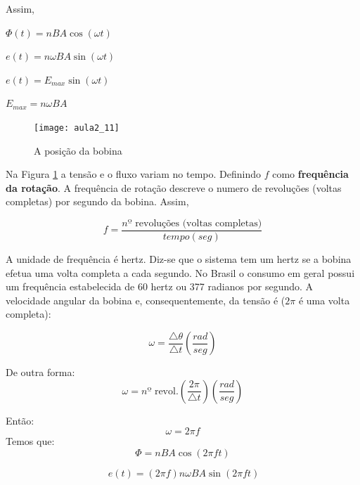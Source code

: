 Assim,

$\Phi(t)=nBA\cos(\omega t)$

$e(t)=n\omega BA\sin(\omega t)$

$e(t)=E_{max}\sin(\omega t)$

$E_{max}=n\omega BA$

\begin{figure}[H]
\begin{centering}
\texttt{[image: aula2\_11]}\protect\caption{\label{fig:aula2_11}A posição da bobina }
\end{centering}

\end{figure}

Na Figura \ref{fig:aula2_11} a tensão e o fluxo variam no tempo.
Definindo $f$ como \textbf{frequência da rotação}. A frequência de rotação
descreve o numero de revoluções (voltas completas) por segundo da
bobina. Assim,

\begin{equation}\label{eq:freq}
f=\frac{n\text{º revoluções (voltas completas)}}{tempo(seg)}
\end{equation}

A unidade de frequência é hertz. Diz-se que o sistema tem um hertz
se a bobina efetua uma volta completa a cada segundo. No Brasil o
consumo em geral possui um frequência estabelecida de $60$ hertz
ou 377 radianos por segundo. 
A velocidade angular da bobina e, consequentemente, da tensão é ($2\pi$
é uma volta completa):

\begin{equation}\label{eq:omega6}
\omega=\frac{\triangle\theta}{\triangle t}(\frac{rad}{seg})
\end{equation}

De outra forma:
\begin{equation}\label{eq:omega7}
\omega=n\text{º revol.}(\frac{2\pi}{\triangle t})(\frac{rad}{seg})
\end{equation}

Então:
\begin{equation}\label{eq:omega8}
\omega=2\pi f
\end{equation}
Temos que:
\begin{equation}\label{eq:omega9}
\Phi=nBA\cos(2\pi ft)
\end{equation}

\begin{equation}\label{eq:omega10}
\ e(t)=(2\pi f)n\omega BA\sin(2\pi ft)
\end{equation}


